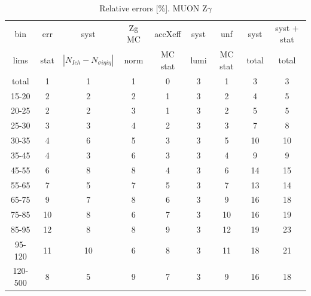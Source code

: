 \begin{table}[h]
  \scriptsize
  \begin{center}
  \caption{Relative errors [\%]. MUON Z$\gamma$}
  \begin{tabular}{|c|c|c|c|c|c|c|c|c|}
    bin  & err & syst & Zg MC & accXeff & syst & unf & syst & syst + stat\\
    lims  & stat & $|N_{Ich}-N_{\sigma{i\eta i\eta}}|$ & norm & MC stat & lumi & MC stat & total & total\\ \hline
    total  & 1 & 1 & 1 & 0 & 3 & 1 & 3 & 3 \\ \hline
    15-20 & 2 & 2 & 2 & 1 & 3 & 2 & 4 & 5 \\ \hline
    20-25 & 2 & 2 & 3 & 1 & 3 & 2 & 5 & 5 \\ \hline
    25-30 & 3 & 3 & 4 & 2 & 3 & 3 & 7 & 8 \\ \hline
    30-35 & 4 & 6 & 5 & 3 & 3 & 5 & 10 & 10 \\ \hline
    35-45 & 4 & 3 & 6 & 3 & 3 & 4 & 9 & 9 \\ \hline
    45-55 & 6 & 8 & 8 & 4 & 3 & 6 & 14 & 15 \\ \hline
    55-65 & 7 & 5 & 7 & 5 & 3 & 7 & 13 & 14 \\ \hline
    65-75 & 9 & 7 & 8 & 6 & 3 & 9 & 16 & 18 \\ \hline
    75-85 & 10 & 8 & 6 & 7 & 3 & 10 & 16 & 19 \\ \hline
    85-95 & 12 & 8 & 8 & 9 & 3 & 12 & 19 & 23 \\ \hline
    95-120 & 11 & 10 & 6 & 8 & 3 & 11 & 18 & 21 \\ \hline
    120-500 & 8 & 5 & 9 & 7 & 3 & 9 & 16 & 18 \\ \hline
  \end{tabular}
  \label{tab:systInPercent_MUON_ZGamma}
  \end{center}
\end{table}

